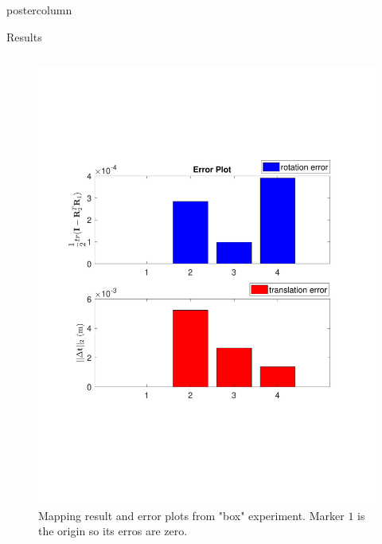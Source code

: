 \documentclass{beamer}
\begin{document}
\begin{frame}
\begin{columns}
\begin{column}{.57\textwidth}
\begin{beamercolorbox}[center]{postercolumn}
\begin{minipage}{.98\textwidth}
{\begin{myblock}{Results}
\begin{minipage}[0.3\textheight]{\textwidth}
\begin{columns}[T]
\begin{column}{0.33\textwidth}
\begin{enumerate}[label=,labelindent=\parindent,leftmargin=*]
\begin{figure}
\includegraphics[width=1.0\textwidth]{img/box_rt_new}
\caption{Mapping result and error plots from "box" experiment. Marker $1$ is the origin so its erros are zero.}
\label{fig:box_res}
\end{figure}
\end{enumerate}
\end{column}


\end{columns}
\end{minipage}
\end{myblock}}
\end{minipage}
\end{beamercolorbox}
\end{column}
\end{columns}
\end{frame}
\end{document}

